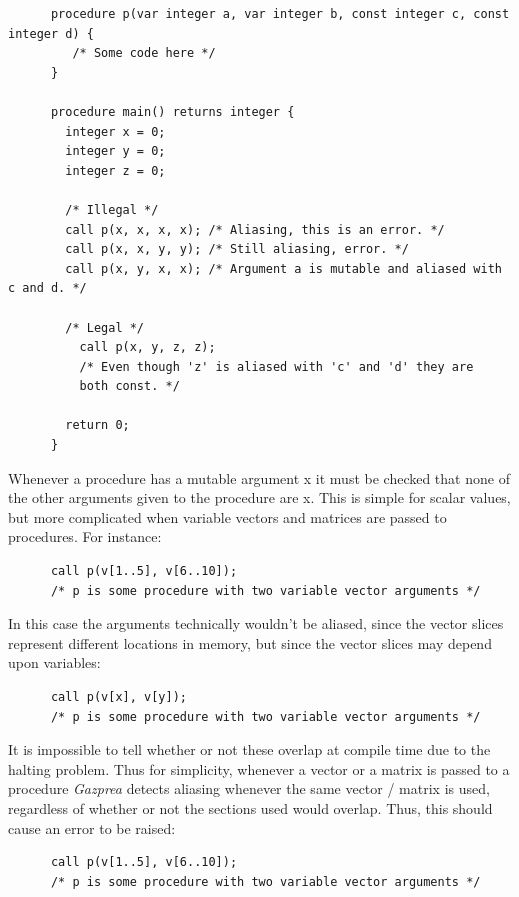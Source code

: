 \documentclass{article}
\begin{document}
    \begin{lstlisting}
      procedure p(var integer a, var integer b, const integer c, const integer d) {
         /* Some code here */
      }

      procedure main() returns integer {
        integer x = 0;
        integer y = 0;
        integer z = 0;

        /* Illegal */
        call p(x, x, x, x); /* Aliasing, this is an error. */
        call p(x, x, y, y); /* Still aliasing, error. */
        call p(x, y, x, x); /* Argument a is mutable and aliased with c and d. */

        /* Legal */
          call p(x, y, z, z);
          /* Even though 'z' is aliased with 'c' and 'd' they are
          both const. */

        return 0;
      }
    \end{lstlisting}

    Whenever a procedure has a mutable argument x it must be checked that none of the other arguments given to the
    procedure are x. This is simple for scalar values, but more complicated when variable vectors and matrices are
    passed to procedures. For instance:

    \begin{lstlisting}
      call p(v[1..5], v[6..10]);
      /* p is some procedure with two variable vector arguments */
    \end{lstlisting}

    In this case the arguments technically wouldn't be aliased, since the vector slices represent different
    locations in memory, but since the vector slices may depend upon variables:

    \begin{lstlisting}
      call p(v[x], v[y]);
      /* p is some procedure with two variable vector arguments */
    \end{lstlisting}

    It is impossible to tell whether or not these overlap at compile time due to the halting problem. Thus for
    simplicity, whenever a vector or a matrix is passed to a procedure \textit{Gazprea} detects aliasing whenever the
    same vector / matrix is used, regardless of whether or not the sections used would overlap.  Thus, this should
    cause an error to be raised:

    \begin{lstlisting}
      call p(v[1..5], v[6..10]);
      /* p is some procedure with two variable vector arguments */
    \end{lstlisting}
\end{document}
